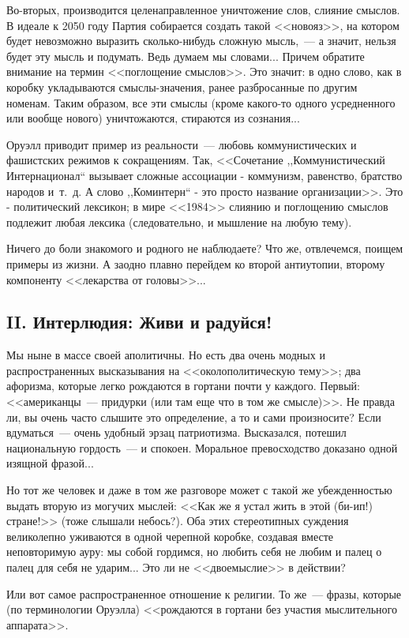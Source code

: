 \documentclass{scrbook}
\newcommand{\glqq}{,,}
\newcommand{\grqq}{``}
\newcommand{\flqq}{<<}
\newcommand{\frqq}{>>}
\newcommand{\mdash}{~--- }
\newcommand{\commamdash}{~--- } %
\newcommand{\essaysection}[1]{\subsection*{#1}\nopagebreak}
\begin{document}
Во-вторых, производится целенаправленное уничтожение слов, слияние смыслов. В идеале к 2050 году Партия собирается создать такой {\flqq}новояз{\frqq}, на котором будет невозможно выразить сколько-нибудь сложную мысль,{\commamdash}а значит, нельзя будет эту мысль и подумать. Ведь думаем мы словами... Причем обратите внимание на термин {\flqq}поглощение смыслов{\frqq}. Это значит: в одно слово, как в коробку укладываются смыслы-значения, ранее разбросанные по другим номенам. Таким образом, все эти смыслы (кроме какого-то одного усредненного или вообще нового) уничтожаются, стираются из сознания...

Оруэлл приводит пример из реальности{\mdash}любовь коммунистических и фашистских режимов к сокращениям. Так, {\flqq}Сочетание {\glqq}Коммунистический Интернационал{\grqq} вызывает сложные ассоциации - коммунизм, равенство, братство народов и~т.~д. А слово {\glqq}Коминтерн{\grqq} - это просто название организации{\frqq}. Это - политический лексикон; в мире {\flqq}1984{\frqq} слиянию и поглощению смыслов подлежит любая лексика (следовательно, и мышление на любую тему).
 
Ничего до боли знакомого и родного не наблюдаете? Что же, отвлечемся, поищем примеры из жизни. А заодно плавно перейдем ко второй антиутопии, второму компоненту {\flqq}лекарства от головы{\frqq}... 
       
\essaysection{II. Интерлюдия: Живи и радуйся!} 
       
Мы ныне в массе своей аполитичны. Но есть два очень модных и распространенных высказывания на {\flqq}околополитическую тему{\frqq}; два афоризма, которые легко рождаются в гортани почти у каждого. Первый: {\flqq}американцы{\mdash}придурки (или там еще что в том же смысле){\frqq}. Не правда ли, вы очень часто слышите это определение, а то и сами произносите? Если вдуматься{\mdash}очень удобный эрзац патриотизма. Высказался, потешил национальную гордость{\mdash}и спокоен. Моральное превосходство доказано одной изящной фразой...

Но тот же человек и даже в том же разговоре может с такой же убежденностью выдать вторую из могучих мыслей: {\flqq}Как же я устал жить в этой (би-ип!) стране!{\frqq} (тоже слышали небось?). Оба этих стереотипных суждения великолепно уживаются в одной черепной коробке, создавая вместе неповторимую ауру: мы собой гордимся, но любить себя не любим и палец о палец для себя не ударим... Это ли не {\flqq}двоемыслие{\frqq} в действии?

Или вот самое распространенное отношение к религии. То же{\mdash}фразы, которые (по терминологии Оруэлла) {\flqq}рождаются в гортани без участия мыслительного аппарата{\frqq}.
 
\end{document}
